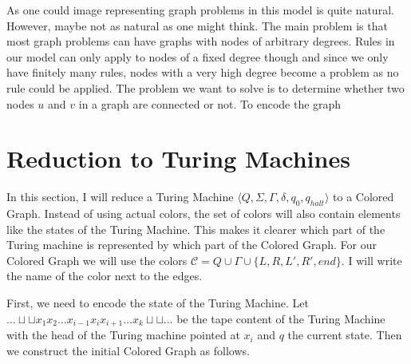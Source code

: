 \documentclass{article}
\newcommand{\C}{\mathcal{C}}
\begin{document}
As one could image representing graph problems in this model is quite natural.
However, maybe not as natural as one might think.
The main problem is that most graph problems can have graphs with nodes of arbitrary degrees.
Rules in our model can only apply to nodes of a fixed degree though and since we only have finitely many rules, nodes with a very high degree become a problem as no rule could be applied.
The problem we want to solve is to determine whether two nodes $u$ and $v$ in a graph are connected or not.
To encode the graph 



\section{Reduction to Turing Machines}

In this section, I will reduce a Turing Machine $\langle Q, \Sigma, \Gamma, \delta, q_0, q_{halt} \rangle$ to a Colored Graph.
Instead of using actual colors, the set of colors will also contain elements like the states of the Turing Machine.
This makes it clearer which part of the Turing machine is represented by which part of the Colored Graph.
For our Colored Graph we will use the colors $\C = Q \cup \Gamma \cup \{L, R, L', R', end\}$.
I will write the name of the color next to the edges.

First, we need to encode the state of the Turing Machine.
Let $\ldots\sqcup\sqcup x_1 x_2 \ldots x_{i-1} x_{i} x_{i+1} \ldots x_k \sqcup\sqcup\ldots$ be the tape content of the Turing Machine with the head of the Turing machine pointed at $x_i$ and $q$ the current state.
Then we construct the initial Colored Graph as follows.
\end{document}

